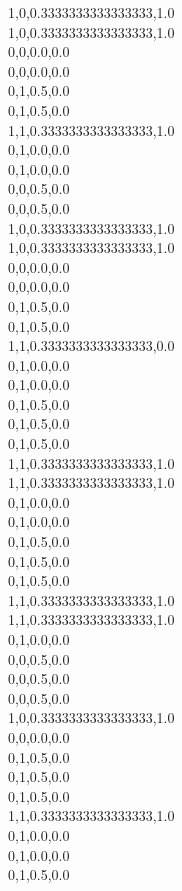 1,0,0.3333333333333333,1.0\\
1,0,0.3333333333333333,1.0\\
0,0,0.0,0.0\\
0,0,0.0,0.0\\
0,1,0.5,0.0\\
0,1,0.5,0.0\\
1,1,0.3333333333333333,1.0\\
0,1,0.0,0.0\\
0,1,0.0,0.0\\
0,0,0.5,0.0\\
0,0,0.5,0.0\\
1,0,0.3333333333333333,1.0\\
1,0,0.3333333333333333,1.0\\
0,0,0.0,0.0\\
0,0,0.0,0.0\\
0,1,0.5,0.0\\
0,1,0.5,0.0\\
1,1,0.3333333333333333,0.0\\
0,1,0.0,0.0\\
0,1,0.0,0.0\\
0,1,0.5,0.0\\
0,1,0.5,0.0\\
0,1,0.5,0.0\\
1,1,0.3333333333333333,1.0\\
1,1,0.3333333333333333,1.0\\
0,1,0.0,0.0\\
0,1,0.0,0.0\\
0,1,0.5,0.0\\
0,1,0.5,0.0\\
0,1,0.5,0.0\\
1,1,0.3333333333333333,1.0\\
1,1,0.3333333333333333,1.0\\
0,1,0.0,0.0\\
0,0,0.5,0.0\\
0,0,0.5,0.0\\
0,0,0.5,0.0\\
1,0,0.3333333333333333,1.0\\
0,0,0.0,0.0\\
0,1,0.5,0.0\\
0,1,0.5,0.0\\
0,1,0.5,0.0\\
1,1,0.3333333333333333,1.0\\
0,1,0.0,0.0\\
0,1,0.0,0.0\\
0,1,0.5,0.0\\
